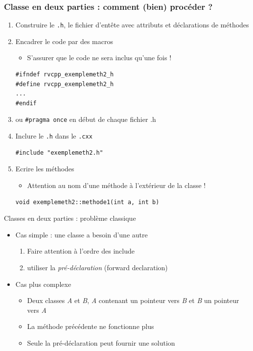 \begin{frame}[fragile]
\frametitle{Classe en deux parties : comment (bien) procéder ?}
\begin{enumerate}
\item Construire le \texttt{.h}, le fichier d'entête avec attributs et déclarations de méthodes
\item Encadrer le code par des macros
\begin{itemize}
\item S'assurer que le code ne sera inclus qu'une fois !
\end{itemize}
\begin{lstlisting}
#ifndef rvcpp_exemplemeth2_h
#define rvcpp_exemplemeth2_h
...
#endif
\end{lstlisting}
\item ou \texttt{\#pragma once} en début de chaque fichier .h
\item Inclure le \texttt{.h} dans le \texttt{.cxx}
\begin{lstlisting}
#include "exemplemeth2.h"
\end{lstlisting}
\item Ecrire les méthodes
\begin{itemize}
\item Attention au nom d'une méthode à l'extérieur de la classe !
\end{itemize}
\begin{lstlisting}
void exemplemeth2::methode1(int a, int b)
\end{lstlisting}
\end{enumerate}
\end{frame}

\begin{frame}{Classes en deux parties : problème classique}
\begin{itemize}
\item Cas simple : une classe a besoin d'une autre
\begin{enumerate}
\item Faire attention à l'ordre des include
\item utiliser la \textit{pré-déclaration} (forward declaration)
\end{enumerate}
\item Cas plus complexe
\begin{itemize}
\item Deux classes \textit{A} et \textit{B}, \textit{A} contenant un pointeur vers \textit{B} et \textit{B} un pointeur vers \textit{A}
\item La méthode précédente ne fonctionne plus
\item Seule la pré-déclaration peut fournir une solution
\end{itemize}
\end{itemize}
\end{frame}

